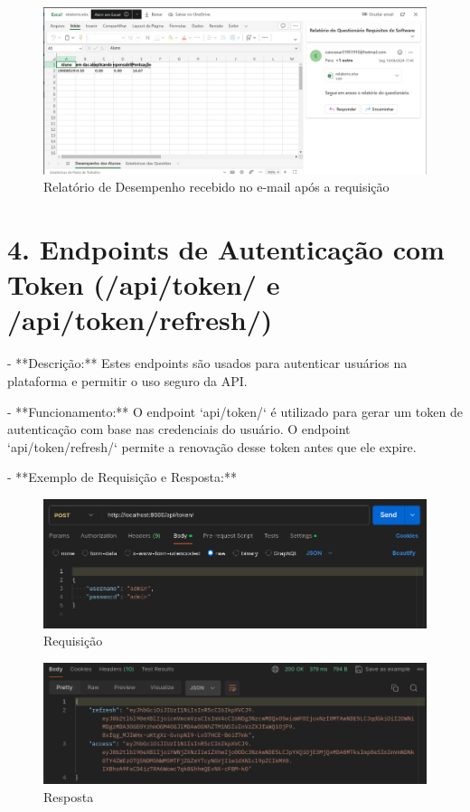 \begin{figure}[H]
    \centering
    \includegraphics[width=1\textwidth]{figuras/report_email.png}
    \caption{Relatório de Desempenho recebido no e-mail após a requisição}
    \label{fig:report_questions}
\end{figure}

\section*{4. Endpoints de Autenticação com Token (/api/token/ e /api/token/refresh/)}

- **Descrição:** Estes endpoints são usados para autenticar usuários na plataforma e permitir o uso seguro da API.

- **Funcionamento:** O endpoint `api/token/` é utilizado para gerar um token de autenticação com base nas credenciais do usuário. O endpoint `api/token/refresh/` permite a renovação desse token antes que ele expire.

- **Exemplo de Requisição e Resposta:**

\begin{figure}[H]
    \centering
    \includegraphics[width=1\textwidth]{figuras/token.png}
    \caption{Requisição}
    \label{fig:report_questions}
\end{figure}

\begin{figure}[H]
    \centering
    \includegraphics[width=1\textwidth]{figuras/token_result.png}
    \caption{Resposta}
    \label{fig:report_questions}
\end{figure}

